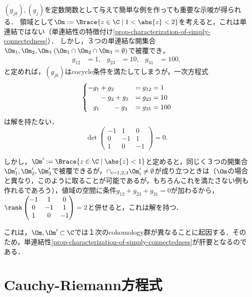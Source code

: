 \documentclass[uplatex, dvipdfmx]{jsreport}
\begin{document}
\begin{example}
    $(g_{jk}),(g_j)$を定数関数として与えて簡単な例を作っても重要な示唆が得られる．
    領域として$\Om:=\Brace{z\in\C\mid 1<\abs{z}<2}$を考えると，これは単連結ではない（単連結性の特徴付け\ref{prop-characterization-of-simply-connectedness}）．
    しかし，３つの単連結な開集合$\Om_1,\Om_2,\Om_3\;(\Om_1\cap\Om_2\cap\Om_3=\emptyset)$で被覆でき，
    \begin{align*}
        g_{12}&=1,&g_{23}&=10,&g_{31}&=100,
    \end{align*}
    と定めれば，$(g_{jk})$はcocycle条件を満たしてしまうが，一次方程式
    \[\begin{cases}
        -g_1+g_2\hphantom{+g_3}&=g_{12}=1\\
        \hphantom{-g_1}-g_2+g_3&=g_{23}=10\\
        \hphantom{-}g_1\hphantom{-g_2}\;-g_3&=g_{31}=100
    \end{cases}\]
    は解を持たない．
    \[\det\begin{pmatrix}-1&1&0\\0&-1&1\\1&0&-1\end{pmatrix}=0.\]

    しかし，$\Om':=\Brace{z\in\C\mid\abs{z}<1}$と定めると，同じく３つの開集合$\Om'_1,\Om'_2,\Om'_3$で被覆できるが，$\cap_{i=1,2,3}\Om'_i\ne\emptyset$が成り立つときは（$\Om$の場合と異なり，このように取ることが可能であるが，もちろんこれを満たさない例も作れるであろう），値域の空間に条件$g_{12}+g_{23}+g_{31}=0$が加わるから，$\rank\begin{pmatrix}-1&1&0\\0&-1&1\\1&0&-1\end{pmatrix}=2$と併せると，これは解を持つ．

    これは，$\Om,\Om'\subset\C$では１次のcohomology群が異なることに起因する．そのため，単連結性\ref{prop-characterization-of-simply-connectedness}が肝要となるのである．
\end{example}

\section{Cauchy-Riemann方程式}
\end{document}
